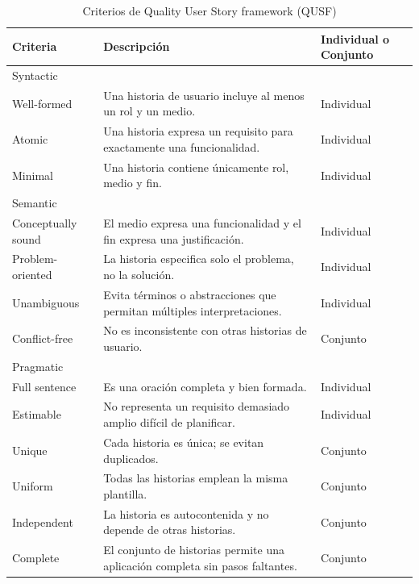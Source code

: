 \begin{table}[h!]
\centering
\begin{tabular}{|l|p{6cm}|p{2cm}|}
\hline
\textbf{Criteria} & \textbf{Descripción} & \textbf{Individual o Conjunto} \\
\hline

\multicolumn{3}{|l|}{Syntactic} \\ \hline
Well-formed & Una historia de usuario incluye al menos un rol y un medio. & Individual \\ \hline
Atomic & Una historia expresa un requisito para exactamente una funcionalidad. & Individual \\ \hline
Minimal & Una historia contiene únicamente rol, medio y fin. & Individual \\ \hline

\multicolumn{3}{|l|}{Semantic} \\ \hline
Conceptually sound & El medio expresa una funcionalidad y el fin expresa una justificación. & Individual \\ \hline
Problem-oriented & La historia especifica solo el problema, no la solución. & Individual \\ \hline
Unambiguous & Evita términos o abstracciones que permitan múltiples interpretaciones. & Individual \\ \hline
Conflict-free & No es inconsistente con otras historias de usuario. & Conjunto \\ \hline

\multicolumn{3}{|l|}{Pragmatic} \\ \hline
Full sentence & Es una oración completa y bien formada. & Individual \\ \hline
Estimable & No representa un requisito demasiado amplio difícil de planificar. & Individual \\ \hline
Unique & Cada historia es única; se evitan duplicados. & Conjunto \\ \hline
Uniform & Todas las historias emplean la misma plantilla. & Conjunto \\ \hline
Independent & La historia es autocontenida y no depende de otras historias. & Conjunto \\ \hline
Complete & El conjunto de historias permite una aplicación completa sin pasos faltantes. & Conjunto \\ \hline

\end{tabular}
\caption{Criterios de Quality User Story framework (QUSF)}
\label{table:qusf}
\end{table}

